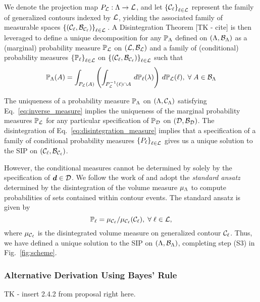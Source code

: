We denote the projection map $P_{\mathcal{L}} : {\Lambda} \to \mathcal{L}$, and let $\left\{\mathcal{C}_\ell\right\}_{\ell\in\mathcal{L}}$ represent the family of generalized contours indexed by $\mathcal{L}$, yielding the associated family of measurable spaces $\left\{\left ( \mathcal{C}_\ell, \mathcal{B}_{\mathcal{C}_\ell} \right )\right\}_{\ell\in\mathcal{L}}{}$.
A Disintegration Theorem [TK - cite] is then leveraged to define a unique decomposition for any $\operatorname*{\mathbb{P}_{{\Lambda}}}$ defined on $({\Lambda}, \mathcal{B}_{{\Lambda}})$ as a (marginal) probability measure $\mathbb{P}_{\mathcal{L}}$ on $(\mathcal{L}, \mathcal{B}_{\mathcal{L}})$ and a family of (conditional) probability measures $\left\{\mathbb{P}_\ell\right\}_{\ell\in\mathcal{L}}$ on $\left\{\left ( \mathcal{C}_\ell, \mathcal{B}_{\mathcal{C}_\ell} \right )\right\}_{\ell\in\mathcal{L}}$ such that
\begin{equation}\label{eq:disintegration_measure}
\operatorname*{\mathbb{P}_{{\Lambda}}} (A) = \int_{P_{\mathcal{L}}(A)} \left ( \int_{P_{\mathcal{L}}^{-1} (\ell) \cap A}\, d\mathbb{P}_\ell(\lambda) \right )\, d\mathbb{P}_{\mathcal{L}} (\ell), \; \forall \; A \in \mathcal{B}_{{\Lambda}}
\end{equation}

The uniqueness of a probability measure $\operatorname*{\mathbb{P}_{{\Lambda}}}$ on ${({\Lambda}, \mathcal{C}_{{\Lambda}})}$ satisfying Eq.~\eqref{eq:inverse_measure} implies the uniqueness of the marginal probability measures $\mathbb{P}_{\mathcal{L}}$ for any particular specification of $\operatorname*{\mathbb{P}_{\mathcal{D}}}$ on ${(\mathcal{D}, \mathcal{B}_{\mathcal{D}})}$.
The disintegration of Eq.~\eqref{eq:disintegration_measure} implies that a specification of a family of conditional probability measures $\left\{P_\ell\right\}_{\ell\in\mathcal{L}}$ gives us a unique solution to the SIP on ${(\mathcal{C}_\ell, \mathcal{B}_{\mathcal{C}_\ell})}$.

However, the conditional measures cannot be determined by solely by the specification of $\operatorname*{\boldsymbol{d}}\in\mathcal{D}$.
We follow the work of \cite{BET+14} and adopt the \emph{standard ansatz} determined by the disintegration of the volume measure $\mu_{{\Lambda}}$ to compute probabilities of sets contained within contour events.
The standard ansatz is given by
\begin{equation}\label{eq:standard_ansatz}
\mathbb{P}_\ell = \mu_{\mathcal{C}_\ell} / \mu_{\mathcal{C}_\ell}(\mathcal{C}_\ell), \; \forall \; \ell \in \mathcal{L},
\end{equation}
where $\mu_{\mathcal{C}_\ell}$ is the disintegrated volume measure on generalized contour $\mathcal{C}_\ell$.
Thus, we have defined a unique solution to the SIP on ${({\Lambda}, \mathcal{B}_{{\Lambda}})}$, completing step (S3) in Fig.~\ref{fig:scheme}.

\subsubsection{Alternative Derivation Using Bayes' Rule}
TK - insert 2.4.2 from proposal right here. 
